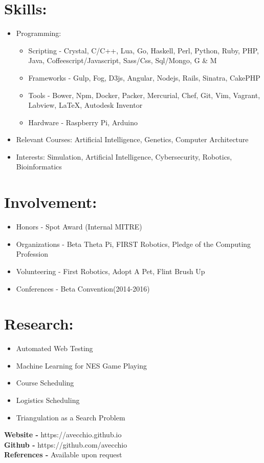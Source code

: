 \documentclass{res}
\begin{document}
\section{Skills:}
\begin{itemize}[leftmargin=*]
\item Programming:
\begin{itemize}[label=$\circ$]
\item Scripting - Crystal, C/C++, Lua, Go, Haskell, Perl, Python, Ruby, PHP, Java, Coffeescript/Javascript, Sass/Css, Sql/Mongo, G \& M
\item Frameworks - Gulp, Fog, D3js, Angular, Nodejs, Rails, Sinatra, CakePHP
\item Tools - Bower, Npm, Docker, Packer, Mercurial, Chef, Git, Vim, Vagrant, Labview, \LaTeX, Autodesk Inventor
\item Hardware - Raspberry Pi, Arduino
\end{itemize}
\item Relevant Courses: Artificial Intelligence, Genetics, Computer Architecture
\item Interests: Simulation, Artificial Intelligence, Cybersecurity, Robotics, Bioinformatics
\end{itemize}

\section{Involvement:}
\begin{itemize}[leftmargin=*]
\item Honors - Spot Award (Internal MITRE)
\item Organizations - Beta Theta Pi, FIRST Robotics, Pledge of the Computing Profession
\item Volunteering - First Robotics, Adopt A Pet, Flint Brush Up
\item Conferences - Beta Convention(2014-2016)%
\end{itemize}

\section{Research:}
\begin{itemize}[leftmargin=*]
\item Automated Web Testing
\item Machine Learning for NES Game Playing
\item Course Scheduling
\item Logistics Scheduling
\item Triangulation as a Search Problem
\end{itemize}

\begin{center}
\textbf{Website - }https://avecchio.github.io\\
\textbf{Github - }https://github.com/avecchio\\
\textbf{References - }Available upon request
\end{center}
\end{document}
